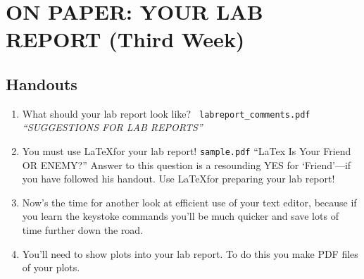 \documentclass[12pt,preprint]{aastex}
\begin{document}
\section{ON PAPER: YOUR LAB REPORT (Third Week)} \label{report}

\subsection{Handouts}

\begin{enumerate}
\item What should your lab report look like? {\tt
  labreport\_comments.pdf} {\it ``SUGGESTIONS FOR LAB REPORTS''}

\item You must use \LaTeX for your lab report! {\tt sample.pdf} ``LaTex
  Is Your Friend OR ENEMY?'' Answer to this question is a
  resounding YES for `Friend'---if you have followed his handout. Use
  \LaTeX for preparing your lab report!

\item Now's the time for another look at efficient use of your text
  editor, because if you learn the keystoke commands you'll be much
  quicker and save lots of time further down the road.

\item You'll need to show plots into your lab report. To do this you
  make PDF files of your plots. %

\end{enumerate}
\end{document}
